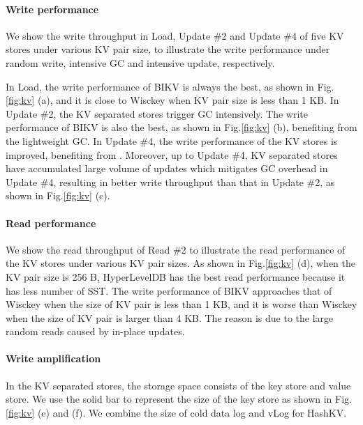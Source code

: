 \documentclass[sigconf]{acmart}
\begin{document}
\paragraph*{Write performance}
We show the write throughput in Load, Update \#2 and Update \#4 of five KV stores under various KV pair size, to illustrate the write performance under random write, intensive GC and intensive update, respectively.

In Load, the write performance of BIKV is always the best, as shown in Fig.\ref{fig:kv} (a), and it is close to Wisckey when KV pair size is less than 1 KB. In Update \#2, the KV separated stores trigger GC intensively. The write performance of BIKV is also the best, as shown in Fig.\ref{fig:kv} (b), benefiting from the lightweight GC. In Update \#4, the write performance of the KV stores is improved, benefiting from {} {\color{red}{why write would benefit from read?}} . Moreover, up to Update \#4, KV separated stores have accumulated large volume of updates which mitigates GC overhead  in Update \#4, resulting in better write throughput than that in Update \#2, as shown in Fig.\ref{fig:kv} (c).

\paragraph*{Read performance}
We show the read throughput of Read \#2 to illustrate the read performance of the KV stores under various KV pair sizes. As shown in Fig.\ref{fig:kv} (d), when the KV pair size is 256 B, HyperLevelDB has the best read performance because it has less number of SST. The write performance of BIKV approaches that of Wisckey when the size of KV pair is less than 1 KB, and it is worse than Wisckey when the size of KV pair is larger than 4 KB. The reason is due to the large random reads caused by in-place updates.

\paragraph*{Write amplification}
In the KV separated stores, the storage space consists of the key store and value store. We use the solid bar to represent the size of the key store as shown in Fig.\ref{fig:kv} (e) and (f). We combine the size of cold data log and vLog for HashKV. 
\end{document}
